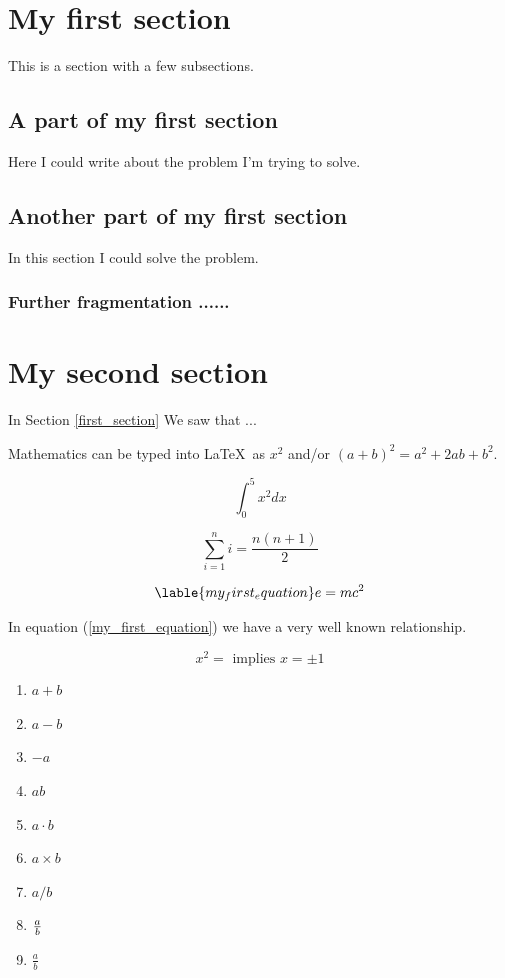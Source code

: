 \documentclass{article} %
\begin{document}
\section{My first section} 

This is a section with a few subsections.

    \subsection{A part of my first section}
    
    Here I could write about the problem I'm trying to solve.
    
    \subsection{Another part of my first section}
    
    In this section I could solve the problem.
    
        \subsubsection{Further fragmentation ...... }
        
\section{ My second section }

In Section \ref{first_section} We saw that ... 

Mathematics can be typed into \LaTeX\ as $x^2$ and/or \((a+b)^2=a^2+2ab+b^2\). 

\[
    \int_{0}^{5}x^2dx
\]

\[
    \sum_{i=1}^{n}i=\frac{n(n+1)}{2}
\]

\begin{equation}\lable{my_first_equation}
    e=mc^2
\end{equation}

In equation (\ref{my_first_equation}) we have a very well known relationship.

\[
    x^2 = \text{ implies } x = \pm 1
\]

\begin{enumerate}
    \item \(a+b\)
    \item \(a-b\)
    \item \(-a\)
    \item \(ab\)
    \item \(a\cdot b\)
    \item \(a\times b\)
    \item \(a/b\)
    \item \({a \over b}\)
    \item \(\frac{a}{b}\)
\end{enumerate}
\end{document}
